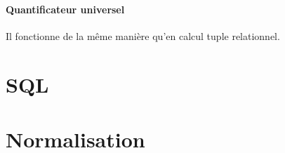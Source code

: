 \documentclass[a4paper]{article}
\begin{document}
  \paragraph{Quantificateur universel}
  Il fonctionne de la même manière qu'en calcul tuple relationnel.


\section{SQL}


\section{Normalisation}
\end{document}
